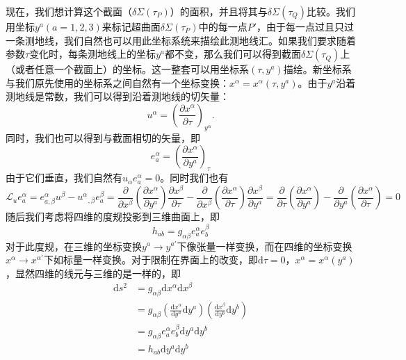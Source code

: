 \documentclass[hyperref, UTF8, a4paper]{ctexart}
\begin{document}
现在，我们想计算这个截面（$\delta \Sigma ( \tau _{P})$）的面积，并且将其与$\delta \Sigma ( \tau _{Q})$比较。我们用坐标$y^{a}( a=1,2,3)$来标记超曲面$\delta \Sigma ( \tau _{P})$中的每一点$P'$，由于每一点过且只过一条测地线，我们自然也可以用此坐标系统来描绘此测地线汇。如果我们要求随着参数$\tau $变化时，每条测地线上的坐标$y^{a}$都不变，那么我们可以得到截面$\delta \Sigma ( \tau _{Q})$上（或者任意一个截面上）的坐标。这一整套可以用坐标系$(\tau ,y^{a} )$描绘。新坐标系与我们原先使用的坐标系之间自然有一个坐标变换：$x^{\alpha } =x^{\alpha } (\tau ,y^{a} )$。由于$y^{a}$沿着测地线是常数，我们可以得到沿着测地线的切矢量：
\begin{equation*}
	u^{\alpha } =\left(\frac{\partial x^{\alpha }}{\partial \tau }\right)_{y^{\alpha }} .
\end{equation*}
同时，我们也可以得到与截面相切的矢量，即
\begin{equation*}
	e_{a}^{\alpha } =\left(\frac{\partial x^{\alpha }}{\partial y^{a}}\right)_{\tau }
\end{equation*}
由于它们垂直，我们自然有$u_{\alpha } e_{a}^{\alpha } =0$。同时我们也有
\begin{equation*}
	\mathcal{L}_{u} e_{a}^{\alpha } =e_{a,\beta }^{\alpha } u^{\beta } -u^{\alpha }{}_{,\beta } e_{a}^{\beta } =\frac{\partial }{\partial x^{\beta }}\left(\frac{\partial x^{\alpha }}{\partial y^{a}}\right)\frac{\partial x^{\beta }}{\partial \tau } -\frac{\partial }{\partial x^{\beta }}\left(\frac{\partial x^{\alpha }}{\partial \tau }\right)\frac{\partial x^{\beta }}{\partial y^{a}} =\frac{\partial }{\partial \tau }\left(\frac{\partial x^{\alpha }}{\partial y^{a}}\right) -\frac{\partial }{\partial y^{a}}\left(\frac{\partial x^{\alpha }}{\partial \tau }\right) =0
\end{equation*}
随后我们考虑将四维的度规投影到三维曲面上，即
\begin{equation*}
	h_{ab} =g_{\alpha \beta } e_{a}^{\alpha } e_{b}^{\beta }
\end{equation*}
对于此度规，在三维的坐标变换$y^{a}\rightarrow y^{a'}$下像张量一样变换，而在四维的坐标变换$x^{\alpha }\rightarrow x^{\alpha '}$下如标量一样变换。对于限制在界面上的改变，即$\mathrm{d} \tau =0$，$x^{\alpha } =x^{\alpha } (y^{a} )$，显然四维的线元与三维的是一样的，即
\begin{equation*}
	\begin{aligned}
		\mathrm{d} s^{2} & =g_{\alpha \beta }\mathrm{d} x^{\alpha }\mathrm{d} x^{\beta }\\
		& =g_{\alpha \beta }\left(\frac{\mathrm{d} x^{\alpha }}{\mathrm{d} y^{a}}\mathrm{d} y^{a}\right)\left(\frac{\mathrm{d} x^{\beta }}{\mathrm{d} y^{b}}\mathrm{d} y^{b}\right)\\
		& =g_{\alpha \beta } e_{a}^{\alpha } e_{b}^{\beta }\mathrm{d} y^{a}\mathrm{d} y^{b}\\
		& =h_{ab}\mathrm{d} y^{a}\mathrm{d} y^{b}
	\end{aligned}
\end{equation*}
\end{document}
